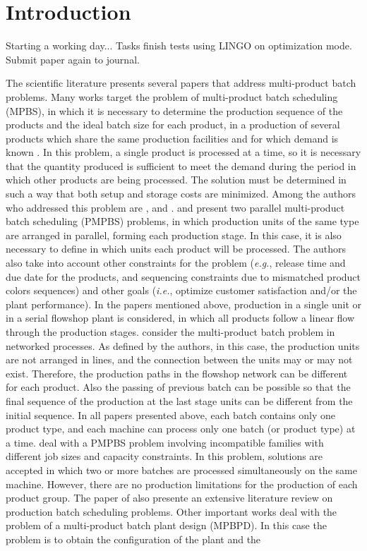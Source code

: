 \documentclass[authoryear,manuscript,12pt]{elsarticle}
\begin{document}

\section{Introduction}
\label{sec:intro}

Starting a working day... 
Tasks finish tests using LINGO on optimization mode.
Submit paper again to journal.

The scientific literature presents several papers that address multi-product batch problems. Many works target the problem of multi-product batch scheduling (MPBS), in which it is necessary to determine the production sequence of the products and the ideal batch size for each product, in a production of several products which share the same production facilities and for which demand is known \citep{Eilon1985}. In this problem, a single product is processed at a time, so it is necessary that the quantity produced is sufficient to meet the demand during the period in which other products are being processed. The solution must be determined in such a way that both setup and storage costs are minimized. Among the authors who addressed this problem are \cite{Eilon1985}, \cite{Omega1993} and \cite{LiuEtAl2020}. \cite{MendezEtAll2000} and \cite{ShiEtAll2017} present two parallel multi-product batch scheduling (PMPBS) problems, in which production units of the same type are arranged in parallel, forming each production stage. In this case, it is also necessary to define in which units each product will be processed. The authors also take into account other constraints for the problem (\emph{e.g.}, release time and due date for the products, and sequencing constraints due to mismatched product colors sequences) and other goals (\emph{i.e.}, optimize customer satisfaction and/or the plant performance). In the papers mentioned above, production in a single unit or in a serial flowshop plant is considered, in which all products follow a linear flow through the production stages. \cite{KimEtAl1996} consider the multi-product batch problem in networked processes. As defined by the authors, in this case, the production units are not arranged in lines, and the connection between the units may or may not exist. Therefore, the production paths in the flowshop network can be different for each product. Also the passing of previous batch can be possible so that the final sequence of the production at the last stage units can be different from the initial sequence. In all papers presented above, each batch contains only one product type, and each machine can process only one batch (or product type) at a time. \cite{LiEtAl2022} deal with a PMPBS problem involving incompatible families with different job sizes and capacity constraints. In this problem, solutions are accepted in which two or more batches are processed simultaneously on the same machine. However, there are no production limitations for the production of each product group. The paper of \cite{LiEtAl2022} also presente an extensive literature review on production batch scheduling problems. Other important works deal with the problem of a multi-product batch plant design (MPBPD). In this case the problem is to obtain the configuration of the plant and the 
\end{document}
